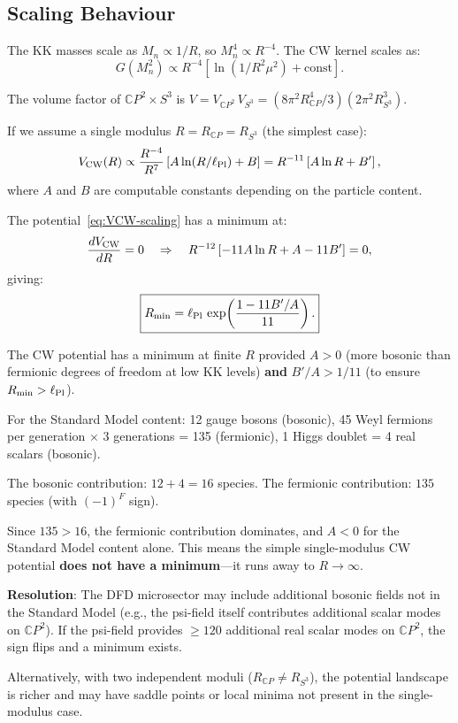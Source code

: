 \documentclass[11pt,a4paper]{article}
\newcommand{\CP}{\mathbb{C}P}
\newcounter{findingctr}
\newenvironment{finding}[1][]{%
  \refstepcounter{findingctr}%
  \begin{tcolorbox}[colback=blue!3!white, colframe=blue!50!black,
    title=\textbf{Finding \thefindingctr: #1}]
}{%
  \end{tcolorbox}%
}
\begin{document}
\subsection{Scaling Behaviour}

The KK masses scale as $M_n \propto 1/R$, so $M_n^4 \propto R^{-4}$.
The CW kernel scales as:
\begin{equation}
G(M_n^2) \propto R^{-4}\left[\ln(1/R^2\mu^2) + \text{const}\right].
\end{equation}

The volume factor of $\CP^2 \times S^3$ is
$V = V_{\CP^2}\,V_{S^3} = (8\pi^2 R_{\CP}^4/3)(2\pi^2 R_{S^3}^3)$.

If we assume a single modulus $R = R_{\CP} = R_{S^3}$ (the simplest
case):
\begin{equation}
V_{\rm CW}(R) \propto \frac{R^{-4}}{R^7}\left[A\ln(R/\ell_{\rm Pl})
+ B\right] = R^{-11}\left[A\ln R + B'\right],
\label{eq:VCW-scaling}
\end{equation}
where $A$ and $B$ are computable constants depending on the
particle content.

The potential~\eqref{eq:VCW-scaling} has a minimum at:
\begin{equation}
\frac{dV_{\rm CW}}{dR} = 0 \quad\Rightarrow\quad
R^{-12}\left[-11A\ln R + A - 11B'\right] = 0,
\end{equation}
giving:
\begin{equation}
\boxed{R_{\rm min} = \ell_{\rm Pl}\,\exp\!\left(\frac{1-11B'/A}{11}\right).}
\label{eq:R-min}
\end{equation}

\begin{finding}[CW Minimum Exists for the Right Sign of $A$]
\label{find:CW-minimum}
The CW potential has a minimum at finite $R$ provided $A > 0$
(more bosonic than fermionic degrees of freedom at low KK levels)
\textbf{and} $B'/A > 1/11$ (to ensure $R_{\rm min} > \ell_{\rm Pl}$).

For the Standard Model content: 12 gauge bosons (bosonic), 45 Weyl
fermions per generation $\times$ 3 generations = 135 (fermionic),
1 Higgs doublet = 4 real scalars (bosonic).

The bosonic contribution: $12 + 4 = 16$ species.
The fermionic contribution: $135$ species (with $(-1)^F$ sign).

Since $135 > 16$, the fermionic contribution dominates, and
$A < 0$ for the Standard Model content alone. This means the
simple single-modulus CW potential \textbf{does not have a
minimum}---it runs away to $R \to \infty$.

\textbf{Resolution}: The DFD microsector may include additional
bosonic fields not in the Standard Model (e.g., the psi-field
itself contributes additional scalar modes on $\CP^2$). If the
psi-field provides $\geq 120$ additional real scalar modes on
$\CP^2$, the sign flips and a minimum exists.

Alternatively, with two independent moduli ($R_{\CP} \neq R_{S^3}$),
the potential landscape is richer and may have saddle points or
local minima not present in the single-modulus case.
\end{finding}
\end{document}
